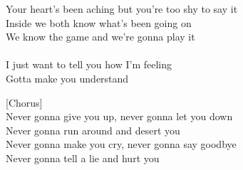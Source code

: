 Your heart's been aching but you're too shy to say it\\
Inside we both know what's been going on\\
We know the game and we're gonna play it\\
\\
I just want to tell you how I'm feeling\\
Gotta make you understand\par
\vspace{10pt}
[Chorus]\\
Never gonna give you up, never gonna let you down\\
Never gonna run around and desert you\\
Never gonna make you cry, never gonna say goodbye\\
Never gonna tell a lie and hurt you
